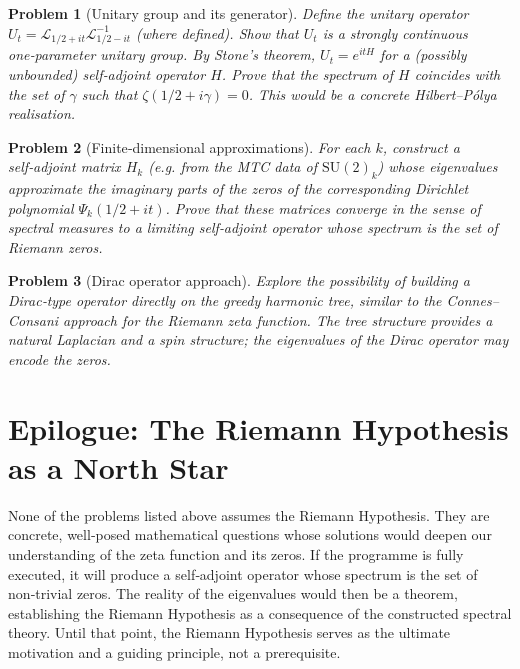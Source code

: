 \documentclass[11pt,a4paper]{article}
\newtheorem{problem}{Problem}[section]
\begin{document}
\begin{problem}[Unitary group and its generator]
Define the unitary operator \(U_t = \mathcal{L}_{1/2+it} \mathcal{L}_{1/2-it}^{-1}\) (where defined). Show that \(U_t\) is a strongly continuous one‑parameter unitary group. By Stone’s theorem, \(U_t = e^{i t H}\) for a (possibly unbounded) self‑adjoint operator \(H\). Prove that the spectrum of \(H\) coincides with the set of \(\gamma\) such that \(\zeta(1/2+i\gamma)=0\). This would be a concrete Hilbert–Pólya realisation.
\end{problem}

\begin{problem}[Finite‑dimensional approximations]
For each \(k\), construct a self‑adjoint matrix \(H_k\) (e.g. from the MTC data of \(\mathrm{SU}(2)_k\)) whose eigenvalues approximate the imaginary parts of the zeros of the corresponding Dirichlet polynomial \(\Psi_k(1/2+it)\). Prove that these matrices converge in the sense of spectral measures to a limiting self‑adjoint operator whose spectrum is the set of Riemann zeros.
\end{problem}

\begin{problem}[Dirac operator approach]
Explore the possibility of building a Dirac‑type operator directly on the greedy harmonic tree, similar to the Connes–Consani approach for the Riemann zeta function. The tree structure provides a natural Laplacian and a spin structure; the eigenvalues of the Dirac operator may encode the zeros.
\end{problem}

\section{Epilogue: The Riemann Hypothesis as a North Star}
None of the problems listed above assumes the Riemann Hypothesis. They are concrete, well‑posed mathematical questions whose solutions would deepen our understanding of the zeta function and its zeros. If the programme is fully executed, it will produce a self‑adjoint operator whose spectrum is the set of non‑trivial zeros. The reality of the eigenvalues would then be a theorem, establishing the Riemann Hypothesis as a consequence of the constructed spectral theory. Until that point, the Riemann Hypothesis serves as the ultimate motivation and a guiding principle, not a prerequisite.
\end{document}

